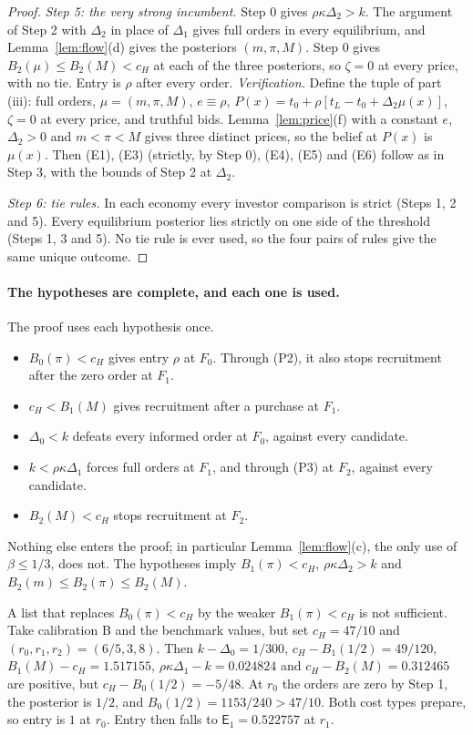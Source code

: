 \documentclass[11pt]{article}
\theoremstyle{definition}
\newcommand{\Ent}{\mathsf E}
\begin{document}
\begin{proof}
\emph{Step 5: the very strong incumbent.} Step 0 gives $\rho\kappa\Delta_2>k$. The argument of Step 2 with
$\Delta_2$ in place of $\Delta_1$ gives full orders in every equilibrium, and Lemma~\ref{lem:flow}(d) gives the
posteriors $(m,\pi,M)$. Step 0 gives $B_2(\mu)\le B_2(M)<c_H$ at each of the three posteriors, so $\zeta=0$
at every price, with no tie. Entry is $\rho$ after every order. \emph{Verification.} Define the tuple of part
(iii): full orders, $\mu=(m,\pi,M)$, $e\equiv\rho$, $P(x)=t_0+\rho[t_L-t_0+\Delta_2\mu(x)]$, $\zeta=0$ at every
price, and truthful bids. Lemma~\ref{lem:price}(f) with a constant $e$, $\Delta_2>0$ and $m<\pi<M$ gives three
distinct prices, so the belief at $P(x)$ is $\mu(x)$. Then (E1), (E3) (strictly, by Step 0), (E4), (E5) and (E6)
follow as in Step 3, with the bounds of Step 2 at $\Delta_2$.

\emph{Step 6: tie rules.} In each economy every investor comparison is strict (Steps 1, 2 and 5). Every
equilibrium posterior lies strictly on one side of the threshold (Steps 1, 3 and 5). No tie rule is ever used,
so the four pairs of rules give the same unique outcome.
\end{proof}

\paragraph{The hypotheses are complete, and each one is used.} The proof uses each hypothesis once.
\begin{itemize}
\item $B_0(\pi)<c_H$ gives entry $\rho$ at $F_0$. Through (P2), it also stops recruitment after the zero order at $F_1$.
\item $c_H<B_1(M)$ gives recruitment after a purchase at $F_1$.
\item $\Delta_0<k$ defeats every informed order at $F_0$, against every candidate.
\item $k<\rho\kappa\Delta_1$ forces full orders at $F_1$, and through (P3) at $F_2$, against every candidate.
\item $B_2(M)<c_H$ stops recruitment at $F_2$.
\end{itemize}
Nothing else enters the proof; in particular Lemma~\ref{lem:flow}(c), the only use of $\beta\le1/3$, does not.
The hypotheses imply $B_1(\pi)<c_H$, $\rho\kappa\Delta_2>k$ and $B_2(m)\le B_2(\pi)\le B_2(M)$.

A list that replaces $B_0(\pi)<c_H$ by the weaker $B_1(\pi)<c_H$ is not sufficient. Take calibration B and the
benchmark values, but set $c_H=47/10$ and $(r_0,r_1,r_2)=(6/5,3,8)$. Then $k-\Delta_0=1/300$,
$c_H-B_1(1/2)=49/120$, $B_1(M)-c_H=1.517155$, $\rho\kappa\Delta_1-k=0.024824$ and $c_H-B_2(M)=0.312465$ are positive,
but $c_H-B_0(1/2)=-5/48$. At $r_0$ the orders are zero by Step 1, the posterior is $1/2$, and
$B_0(1/2)=1153/240>47/10$. Both cost types prepare, so entry is $1$ at $r_0$. Entry then falls to
$\Ent_1=0.522757$ at $r_1$.
\end{document}
